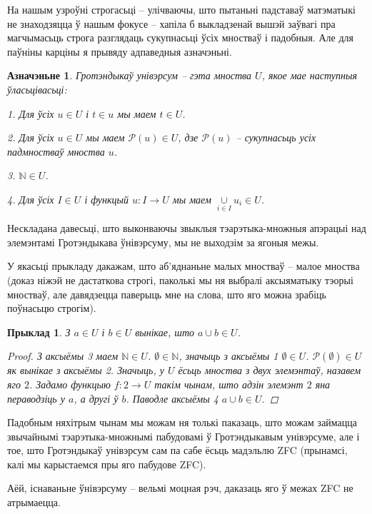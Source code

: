 \documentclass[a4paper,12pt]{book}
\newtheorem{example}{Прыклад}[section]
\newtheorem{definition}{Азначэньне}[section]
\begin{document}
На нашым узроўні строгасьці -- улічваючы, што пытаньні падставаў
матэматыкі не знаходзяцца ў нашым фокусе -- хапіла б выкладзенай вышэй
заўвагі пра магчымасьць строга разглядаць сукупнасьці ўсіх мностваў і
падобныя. Але для паўніны карціны я прывяду адпаведныя азначэньні.


\begin{definition}
  Гротэндыкаў унівэрсум -- гэта мноства $U$, якое мае наступныя
  ўласьцівасьці:

  1. Для ўсіх $u \in U$ і $t \in u$ мы маем $t \in U$.

  2. Для ўсіх $u \in U$ мы маем $\mathcal{P}(u) \in U$, дзе
  $\mathcal{P}(u)$ -- сукупнасьць усіх падмностваў мноства $u$.

  3. $\mathbb{N} \in U$.

  4. Для ўсіх $I \in U$ і функцый $u: I \rightarrow U$ мы маем
  $\underset{i \in I}{\cup}u_i \in U$.
\end{definition}

Нескладана давесьці, што выконваючы звыклыя тэарэтыка-множныя апэрацыі
над элемэнтамі Гротэндыкава ўнівэрсуму, мы не выходзім за ягоныя межы.

У якасьці прыкладу дакажам, што аб'яднаньне малых мностваў -- малое
мноства (доказ ніжэй не дастаткова строгі, паколькі мы ня выбралі
аксыяматыку тэорыі мностваў, але давядзецца паверыць мне на слова, што
яго можна зрабіць поўнасьцю строгім).

\begin{example}
  З $a \in U$ і $b \in U$ вынікае, што $a \cup b \in U$.

  \begin{proof}
    З аксыёмы 3 маем $\mathbb{N} \in U$. $\emptyset \in \mathbb{N}$,
    значыць з аксыёмы 1 $\emptyset \in U$. $\mathcal{P}(\emptyset) \in
    U$ як вынікае з аксыёмы 2. Значыць, у $U$ ёсьць мноства з двух
    элемэнтаў, назавем яго $2$. Задамо функцыю $f: 2 \rightarrow U$
    такім чынам, што адзін элемэнт $2$ яна пераводзіць у $a$, а другі
    ў $b$. Паводле аксыёмы 4 $a \cup b \in U$.
  \end{proof}
\end{example}

Падобным няхітрым чынам мы можам ня толькі паказаць, што можам
займацца звычайнымі тэарэтыка-множнымі пабудовамі ў Гротэндыкавым
унівэрсуме, але і тое, што Гротэндыкаў унівэрсум сам па сабе ёсьць
мадэльлю ZFC (прынамсі, калі мы карыстаемся пры яго пабудове ZFC).

Аёй, існаваньне ўнівэрсуму -- вельмі моцная рэч, даказаць яго ў межах
ZFC не атрымаецца.
\end{document}
